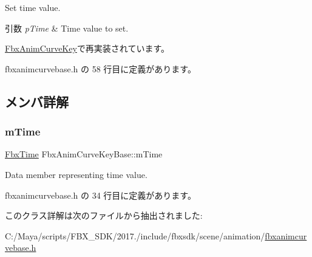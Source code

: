 Set time value. 
\begin{DoxyParams}{引数}
{\em p\+Time} & Time value to set. \\
\hline
\end{DoxyParams}


\hyperlink{class_fbx_anim_curve_key_a6ebc96b8346a345534c0eb2e1b6d9291}{Fbx\+Anim\+Curve\+Key}で再実装されています。



 fbxanimcurvebase.\+h の 58 行目に定義があります。



\subsection{メンバ詳解}
\mbox{\label{class_fbx_anim_curve_key_base_a8b62f6694176ae418ed4cb936f52545a}} 
\subsubsection{\texorpdfstring{m\+Time}{mTime}}
{\footnotesize\ttfamily \hyperlink{class_fbx_time}{Fbx\+Time} Fbx\+Anim\+Curve\+Key\+Base\+::m\+Time}

Data member representing time value. 

 fbxanimcurvebase.\+h の 34 行目に定義があります。



このクラス詳解は次のファイルから抽出されました\+:\begin{DoxyCompactItemize}
\item 
C\+:/\+Maya/scripts/\+F\+B\+X\+\_\+\+S\+D\+K/2017./include/fbxsdk/scene/animation/\hyperlink{fbxanimcurvebase_8h}{fbxanimcurvebase.\+h}\end{DoxyCompactItemize}
